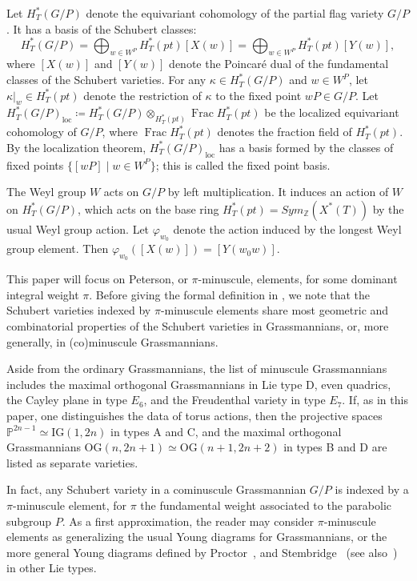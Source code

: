 \documentclass[11pt]{article}
\theoremstyle{definition}
\numberwithin{equation}{section}
\newcommand{\bP}{{\mathbb{P}}}
\DeclareMathOperator{\Frac}{Frac}
\DeclareMathOperator{\loc}{loc}
\begin{document}
Let $H_T^*(G/P)$ denote the equivariant cohomology of the partial flag variety $G/P$. It has a basis of the Schubert classes:
\[H_T^*(G/P)=\bigoplus_{w\in W^P} H_T^*(pt)[X(w)]=\bigoplus_{w\in W^P} H_T^*(pt)[Y(w)],\]
{where $[X(w)]$ and $[Y(w)]$ denote the Poincar{\'e} dual of the fundamental classes of the Schubert varieties.}
For any $\kappa \in H_T^*(G/P)$ and $w\in W^P$, let $\kappa|_w\in H_T^*(pt)$ denote the restriction of $\kappa$ to the fixed point $wP\in G/P$.
Let $H_T^*(G/P)_{\loc} \coloneqq H_T^*(G/P)\otimes_{H_T^*(pt)}\Frac H_T^*(pt)$ be the localized equivariant cohomology of $G/P$, where $\Frac H_T^*(pt)$ denotes the fraction field of $H_T^*(pt)$. 
By the localization theorem,  $H_T^*(G/P)_{\loc}$ has a basis formed by the classes of fixed points $\{[wP]\mid w\in W^P\}$; 
this is called the fixed point basis.  

The Weyl group $W$ acts on $G/P$ by left multiplication. It induces an action of $W$ on $H_T^*(G/P)$, 
which acts on the base ring 
$H_T^*(pt)=Sym_{\mathbb{Z}}(X^*(T))$
by the usual Weyl group action. Let $\varphi_{w_0}$ denote the action induced by 
the longest Weyl group element. Then $\varphi_{w_0}([X(w)])=[Y(w_0w)]$.

{This paper will focus on Peterson, or $\pi$-minuscule, elements, for some 
dominant integral weight $\pi$. Before giving the formal definition in 
, we note that the Schubert varieties indexed by $\pi$-minuscule elements
share most geometric and combinatorial properties of the Schubert varieties in Grassmannians, or, 
more generally, in (co)minuscule Grassmannians.\begin{footnote}{Aside from the ordinary Grassmannians, 
the list of minuscule Grassmannians includes the maximal orthogonal 
Grassmannians in Lie type D, even quadrics, the Cayley plane in type $E_6$, 
and the Freudenthal variety in type $E_7$. If, as in this paper, one distinguishes the data of torus actions, 
then the projective spaces $\bP^{2n-1} \simeq \mathrm{IG}(1,2n)$ in types A and C, and the maximal orthogonal 
Grassmannians $\mathrm{OG}(n,2n+1)\simeq \mathrm{OG}(n+1,2n+2)$ in types B and D are listed as 
separate varieties.}\end{footnote} In fact, any Schubert variety in a cominuscule
Grassmannian $G/P$ is indexed by a $\pi$-minuscule element, for $\pi$ the fundamental weight 
associated to the parabolic subgroup $P$. As a first approximation, the reader may 
consider $\pi$-minuscule elements as generalizing the usual Young diagrams for Grassmannians,
or the more general Young diagrams defined by Proctor~\cite{proctor:bruhat,proctor:minuscule}, and Stembridge~\cite{stembridge:fullycomm,stembridge2001minuscule} (see also~\cite{graham.kreiman:cominuscule_pt}) in other Lie types.
}
\end{document}
